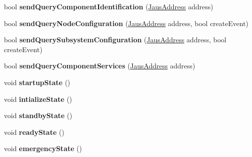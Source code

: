 \begin{DoxyCompactItemize}
\item 
\hypertarget{class_communicator_component_a01b5cf19d4fe7b6c7c9b02ed0080d215}{bool {\bfseries send\-Query\-Component\-Identification} (\hyperlink{struct_jaus_address_struct}{\-Jaus\-Address} address)}\label{class_communicator_component_a01b5cf19d4fe7b6c7c9b02ed0080d215}

\item 
\hypertarget{class_communicator_component_a4286c108518e2c4ad7db2f2640f18ad8}{bool {\bfseries send\-Query\-Node\-Configuration} (\hyperlink{struct_jaus_address_struct}{\-Jaus\-Address} address, bool create\-Event)}\label{class_communicator_component_a4286c108518e2c4ad7db2f2640f18ad8}

\item 
\hypertarget{class_communicator_component_a88a0a1a4117d5e7191af85665356574f}{bool {\bfseries send\-Query\-Subsystem\-Configuration} (\hyperlink{struct_jaus_address_struct}{\-Jaus\-Address} address, bool create\-Event)}\label{class_communicator_component_a88a0a1a4117d5e7191af85665356574f}

\item 
\hypertarget{class_communicator_component_ad4ab9f5ecd3c4da66b373d0085b115a9}{bool {\bfseries send\-Query\-Component\-Services} (\hyperlink{struct_jaus_address_struct}{\-Jaus\-Address} address)}\label{class_communicator_component_ad4ab9f5ecd3c4da66b373d0085b115a9}

\item 
\hypertarget{class_communicator_component_a2cd3851311dbc8cd0c1bddec37283d00}{void {\bfseries startup\-State} ()}\label{class_communicator_component_a2cd3851311dbc8cd0c1bddec37283d00}

\item 
\hypertarget{class_communicator_component_ae0b406f8b45d0a1d814e56a1aa656113}{void {\bfseries intialize\-State} ()}\label{class_communicator_component_ae0b406f8b45d0a1d814e56a1aa656113}

\item 
\hypertarget{class_communicator_component_a35d709f6f851f287e0471fa8aa9bc94b}{void {\bfseries standby\-State} ()}\label{class_communicator_component_a35d709f6f851f287e0471fa8aa9bc94b}

\item 
\hypertarget{class_communicator_component_a78c681449e113b2dcc2b903beb392a5a}{void {\bfseries ready\-State} ()}\label{class_communicator_component_a78c681449e113b2dcc2b903beb392a5a}

\item 
\hypertarget{class_communicator_component_ad629cdeeb39d06c8583b5f64e826235a}{void {\bfseries emergency\-State} ()}\label{class_communicator_component_ad629cdeeb39d06c8583b5f64e826235a}


\end{DoxyCompactItemize}
